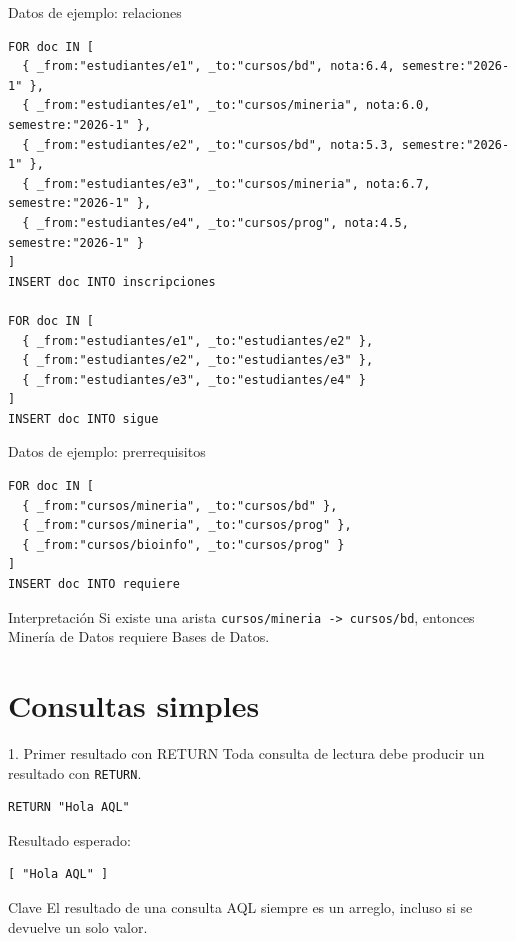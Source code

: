 \documentclass[aspectratio=169,11pt]{beamer}
\begin{document}
\begin{frame}[fragile]{Datos de ejemplo: relaciones}
\begin{lstlisting}
FOR doc IN [
  { _from:"estudiantes/e1", _to:"cursos/bd", nota:6.4, semestre:"2026-1" },
  { _from:"estudiantes/e1", _to:"cursos/mineria", nota:6.0, semestre:"2026-1" },
  { _from:"estudiantes/e2", _to:"cursos/bd", nota:5.3, semestre:"2026-1" },
  { _from:"estudiantes/e3", _to:"cursos/mineria", nota:6.7, semestre:"2026-1" },
  { _from:"estudiantes/e4", _to:"cursos/prog", nota:4.5, semestre:"2026-1" }
]
INSERT doc INTO inscripciones

FOR doc IN [
  { _from:"estudiantes/e1", _to:"estudiantes/e2" },
  { _from:"estudiantes/e2", _to:"estudiantes/e3" },
  { _from:"estudiantes/e3", _to:"estudiantes/e4" }
]
INSERT doc INTO sigue
\end{lstlisting}
\end{frame}

\begin{frame}[fragile]{Datos de ejemplo: prerrequisitos}
\begin{lstlisting}
FOR doc IN [
  { _from:"cursos/mineria", _to:"cursos/bd" },
  { _from:"cursos/mineria", _to:"cursos/prog" },
  { _from:"cursos/bioinfo", _to:"cursos/prog" }
]
INSERT doc INTO requiere
\end{lstlisting}

\vspace{0.25cm}
\begin{block}{Interpretación}
Si existe una arista \texttt{cursos/mineria -> cursos/bd}, entonces Minería de Datos requiere Bases de Datos.
\end{block}
\end{frame}

\section{Consultas simples}

\begin{frame}[fragile]{1. Primer resultado con RETURN}
Toda consulta de lectura debe producir un resultado con \texttt{RETURN}.

\begin{lstlisting}
RETURN "Hola AQL"
\end{lstlisting}

Resultado esperado:
\begin{lstlisting}
[ "Hola AQL" ]
\end{lstlisting}

\begin{block}{Clave}
El resultado de una consulta AQL siempre es un arreglo, incluso si se devuelve un solo valor.
\end{block}
\end{frame}
\end{document}
